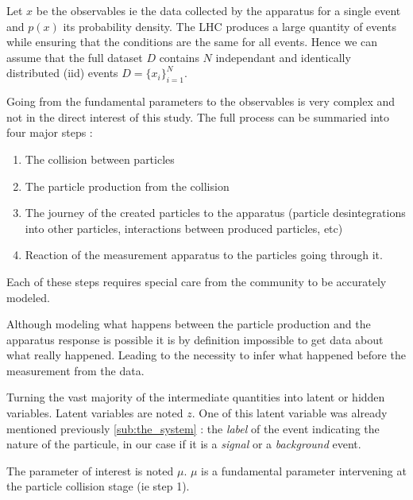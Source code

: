 Let $x$ be the observables ie the data collected by the apparatus for a single event and $p(x)$ its probability density.
The LHC produces a large quantity of events while ensuring that the conditions are the same for all events.
Hence we can assume that the full dataset $D$ contains $N$ independant and identically distributed (iid) events $D = \{x_i\}_{i=1}^N$.

Going from the fundamental parameters to the observables is very complex and not in the direct interest of this study.
The full process can be summaried into four major steps :
\begin{enumerate}
	\item The collision between particles
	\item The particle production from the collision
	\item The journey of the created particles to the apparatus (particle desintegrations into other particles, interactions between produced particles, etc)
	\item Reaction of the measurement apparatus to the particles going through it.
\end{enumerate}

Each of these steps requires special care from the community to be accurately modeled.

Although modeling what happens between the particle production and the apparatus response is possible it is by definition impossible to get data about what really happened.
Leading to the necessity to infer what happened before the measurement from the data.


Turning the vast majority of the intermediate quantities into latent or hidden variables.
Latent variables are noted $z$.
One of this latent variable was already mentioned previously \autoref{sub:the_system} : the \emph{label} of the event indicating the nature of the particule, in our case if it is a \emph{signal} or a \emph{background} event.


The parameter of interest is noted $\mu$.
$\mu$ is a fundamental parameter intervening at the particle collision stage (ie step 1).

